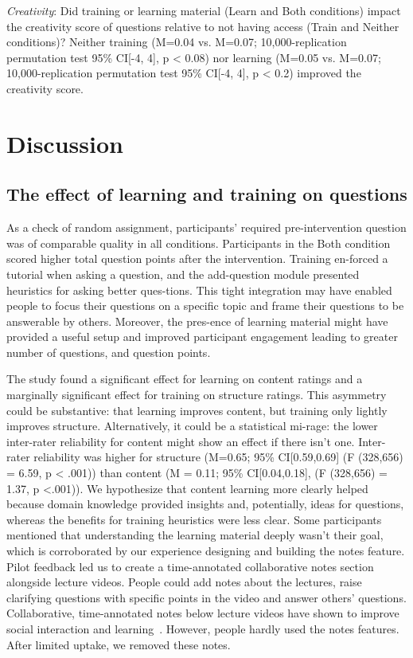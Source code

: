 \textit{Creativity}: Did training or learning material (Learn and Both conditions) impact the creativity score of questions relative to not having access (Train and Neither conditions)? Neither training (M=0.04 vs. M=0.07; 10,000-replication permutation test 95\% CI[-4, 4], p < 0.08) nor learning (M=0.05 vs. M=0.07; 10,000-replication permutation test 95\% CI[-4, 4], p < 0.2) improved the creativity score.

\section{Discussion}
\subsection{The effect of learning and training on questions}
As a check of random assignment, participants’ required pre-intervention question was of comparable quality in all conditions. Participants in the Both condition scored higher total question points after the intervention. Training en-forced a tutorial when asking a question, and the add-question module presented heuristics for asking better ques-tions. This tight integration may have enabled people to focus their questions on a specific topic and frame their questions to be answerable by others. Moreover, the pres-ence of learning material might have provided a useful setup and improved participant engagement leading to greater number of questions, and question points.

The study found a significant effect for learning on content ratings and a marginally significant effect for training on structure ratings. This asymmetry could be substantive: that learning improves content, but training only lightly improves structure. Alternatively, it could be a statistical mi-rage: the lower inter-rater reliability for content might show an effect if there isn’t one. Inter-rater reliability was higher for structure (M=0.65; 95\% CI[0.59,0.69] (F (328,656) = 6.59, p < .001)) than content (M = 0.11; 95\% CI[0.04,0.18], (F (328,656) = 1.37, p <.001)).
We hypothesize that content learning more clearly helped because domain knowledge provided insights and, potentially, ideas for questions, whereas the benefits for training heuristics were less clear. Some participants mentioned that understanding the learning material deeply wasn’t their goal, which is corroborated by our experience designing and building the notes feature. Pilot feedback led us to create a time-annotated collaborative notes section alongside lecture videos. People could add notes about the lectures, raise clarifying questions with specific points in the video and answer others’ questions. Collaborative, time-annotated notes below lecture videos have shown to improve social interaction and learning~\cite{Lee2015}. However, people hardly used the notes features. After limited uptake, we removed these notes.

